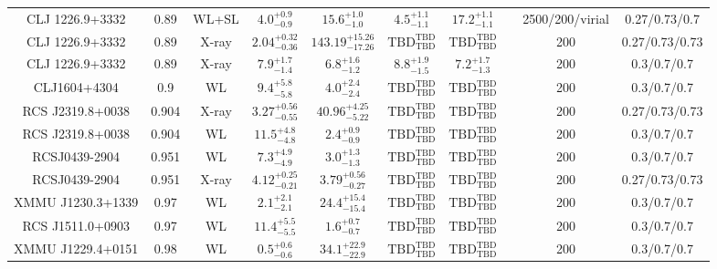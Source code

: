 \begin{table}
\begin{tabular}{cccccccccc}
CLJ 1226.9+3332 & 0.89 & WL+SL & ${4.0}^{+0.9}_{-0.9}$ & ${15.6}^{+1.0}_{-1.0}$ & ${4.5}^{+1.1}_{-1.1}$ & ${17.2}^{+1.1}_{-1.1}$ & \citet{ME14.1} & 2500/200/virial & 0.27/0.73/0.7 \\
CLJ 1226.9+3332 & 0.89 & X-ray & ${2.04}^{+0.32}_{-0.36}$ & ${143.19}^{+15.26}_{-17.26}$ & ${\mathrm{TBD}}^{\mathrm{TBD}}_{\mathrm{TBD}}$ & ${\mathrm{TBD}}^{\mathrm{TBD}}_{\mathrm{TBD}}$ & \citet{BA14.1} & 200 & 0.27/0.73/0.73 \\
CLJ 1226.9+3332 & 0.89 & X-ray & ${7.9}^{+1.7}_{-1.4}$ & ${6.8}^{+1.6}_{-1.2}$ & ${8.8}^{+1.9}_{-1.5}$ & ${7.2}^{+1.7}_{-1.3}$ & \citet{MA06.1} & 200 & 0.3/0.7/0.7 \\
CLJ1604+4304 & 0.9 & WL & ${9.4}^{+5.8}_{-5.8}$ & ${4.0}^{+2.4}_{-2.4}$ & ${\mathrm{TBD}}^{\mathrm{TBD}}_{\mathrm{TBD}}$ & ${\mathrm{TBD}}^{\mathrm{TBD}}_{\mathrm{TBD}}$ & \citet{SE14.1} & 200 & 0.3/0.7/0.7 \\
RCS J2319.8+0038 & 0.904 & X-ray & ${3.27}^{+0.56}_{-0.55}$ & ${40.96}^{+4.25}_{-5.22}$ & ${\mathrm{TBD}}^{\mathrm{TBD}}_{\mathrm{TBD}}$ & ${\mathrm{TBD}}^{\mathrm{TBD}}_{\mathrm{TBD}}$ & \citet{BA14.1} & 200 & 0.27/0.73/0.73 \\
RCS J2319.8+0038 & 0.904 & WL & ${11.5}^{+4.8}_{-4.8}$ & ${2.4}^{+0.9}_{-0.9}$ & ${\mathrm{TBD}}^{\mathrm{TBD}}_{\mathrm{TBD}}$ & ${\mathrm{TBD}}^{\mathrm{TBD}}_{\mathrm{TBD}}$ & \citet{SE14.1} & 200 & 0.3/0.7/0.7 \\
RCSJ0439-2904 & 0.951 & WL & ${7.3}^{+4.9}_{-4.9}$ & ${3.0}^{+1.3}_{-1.3}$ & ${\mathrm{TBD}}^{\mathrm{TBD}}_{\mathrm{TBD}}$ & ${\mathrm{TBD}}^{\mathrm{TBD}}_{\mathrm{TBD}}$ & \citet{SE14.1} & 200 & 0.3/0.7/0.7 \\
RCSJ0439-2904 & 0.951 & X-ray & ${4.12}^{+0.25}_{-0.21}$ & ${3.79}^{+0.56}_{-0.27}$ & ${\mathrm{TBD}}^{\mathrm{TBD}}_{\mathrm{TBD}}$ & ${\mathrm{TBD}}^{\mathrm{TBD}}_{\mathrm{TBD}}$ & \citet{BA14.1} & 200 & 0.27/0.73/0.73 \\
XMMU J1230.3+1339 & 0.97 & WL & ${2.1}^{+2.1}_{-2.1}$ & ${24.4}^{+15.4}_{-15.4}$ & ${\mathrm{TBD}}^{\mathrm{TBD}}_{\mathrm{TBD}}$ & ${\mathrm{TBD}}^{\mathrm{TBD}}_{\mathrm{TBD}}$ & \citet{SE14.1} & 200 & 0.3/0.7/0.7 \\
RCS J1511.0+0903 & 0.97 & WL & ${11.4}^{+5.5}_{-5.5}$ & ${1.6}^{+0.7}_{-0.7}$ & ${\mathrm{TBD}}^{\mathrm{TBD}}_{\mathrm{TBD}}$ & ${\mathrm{TBD}}^{\mathrm{TBD}}_{\mathrm{TBD}}$ & \citet{SE14.1} & 200 & 0.3/0.7/0.7 \\
XMMU J1229.4+0151 & 0.98 & WL & ${0.5}^{+0.6}_{-0.6}$ & ${34.1}^{+22.9}_{-22.9}$ & ${\mathrm{TBD}}^{\mathrm{TBD}}_{\mathrm{TBD}}$ & ${\mathrm{TBD}}^{\mathrm{TBD}}_{\mathrm{TBD}}$ & \citet{SE14.1} & 200 & 0.3/0.7/0.7 \\

\end{tabular}
\end{table}
